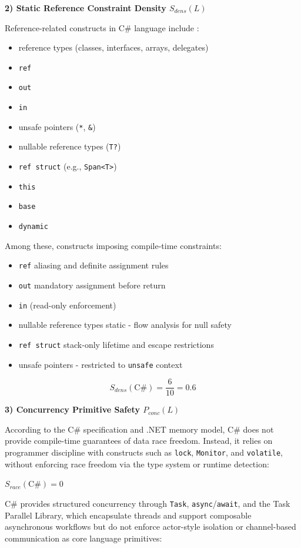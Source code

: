 \textbf{2) Static Reference Constraint Density $S_{dens}(L)$}

Reference-related constructs in C\# language include \cite{ecma334}: 
\begin{itemize}
    \item reference types (classes, interfaces, arrays, delegates)
    \item \texttt{ref}
    \item \texttt{out}
    \item \texttt{in}
    \item unsafe pointers (\texttt{*}, \texttt{\&})
    \item nullable reference types (\texttt{T?})
    \item \texttt{ref struct} (e.g., \texttt{Span<T>})
    \item \texttt{this}
    \item \texttt{base}
    \item \texttt{dynamic}
\end{itemize}

Among these, constructs imposing compile-time constraints: 
\begin{itemize}
    \item \texttt{ref} aliasing and definite assignment rules
    \item \texttt{out} mandatory assignment before return
    \item \texttt{in} (read-only enforcement)
    \item nullable reference types static - flow analysis for null safety
    \item \texttt{ref struct} stack-only lifetime and escape restrictions
    \item unsafe pointers - restricted to \texttt{unsafe} context
\end{itemize}

\[
    S_{dens}(\text{C\#}) = \frac{6}{10} = 0.6
\]

\textbf{3) Concurrency Primitive Safety $P_{conc}(L)$}

According to the C\# specification and .NET memory model, C\# does not provide compile-time guarantees of data race freedom. Instead, it relies on programmer discipline with constructs such as \texttt{lock}, \texttt{Monitor}, and \texttt{volatile}, without enforcing race freedom via the type system or runtime detection:

$S_{race}(\text{C\#}) = 0$

C\# provides structured concurrency through \texttt{Task}, \texttt{async}/\texttt{await}, and the Task Parallel Library, which encapsulate threads and support composable asynchronous workflows but do not enforce actor-style isolation or channel-based communication as core language primitives:

